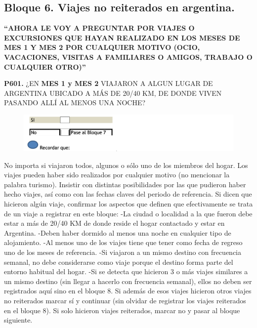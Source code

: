 \documentclass[
  openany]{book}
\begin{document}
\hypertarget{bloque-6.-viajes-no-reiterados-en-argentina.}{%
\subsection{Bloque 6. Viajes no reiterados en argentina.}\label{bloque-6.-viajes-no-reiterados-en-argentina.}}

\textbf{``AHORA LE VOY A PREGUNTAR POR VIAJES O EXCURSIONES QUE HAYAN REALIZADO EN LOS MESES DE MES 1 Y MES 2 POR CUALQUIER MOTIVO (OCIO, VACACIONES, VISITAS A FAMILIARES O AMIGOS, TRABAJO O CUALQUIER OTRO)''}

\textbf{P601.} ¿EN \textbf{MES 1 y MES 2} VIAJARON A ALGUN LUGAR DE ARGENTINA UBICADO A MÁS DE 20/40 KM, DE DONDE VIVEN PASANDO ALLÍ AL MENOS UNA NOCHE?

\begin{figure}

{\centering \includegraphics[width=1\linewidth]{imagenes/figura6-206} 

}

\end{figure}

No importa si viajaron todos, algunos o sólo uno de los miembros del hogar.
Los viajes pueden haber sido realizados por cualquier motivo (no mencionar la palabra turismo). Insistir con distintas posibilidades por las que pudieron haber hecho viajes, así como con las fechas claves del periodo de referencia.
Si dicen que hicieron algún viaje, confirmar los aspectos que definen que efectivamente se trata de un viaje a registrar en este bloque:
-La ciudad o localidad a la que fueron debe estar a más de 20/40 KM de donde reside el hogar contactado y estar en Argentina.
-Deben haber dormido al menos una noche en cualquier tipo de alojamiento.
-Al menos uno de los viajes tiene que tener como fecha de regreso uno de los meses de referencia.
-Si viajaron a un mismo destino con frecuencia semanal, no debe considerarse como viaje porque el destino forma parte del entorno habitual del hogar.
-Si se detecta que hicieron 3 o más viajes similares a un mismo destino (sin llegar a hacerlo con frecuencia semanal), ellos no deben ser registrados aquí sino en el bloque 8. Si además de esos viajes hicieron otros viajes no reiterados marcar sí y continuar (sin olvidar de registrar los viajes reiterados en el bloque 8). Si solo hicieron viajes reiterados, marcar no y pasar al bloque siguiente.
\end{document}
